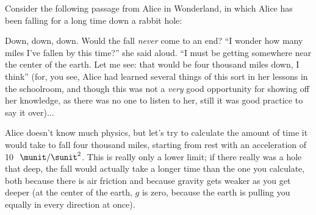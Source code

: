  Consider the following passage from Alice in Wonderland,
in which Alice has been falling for a long time down a rabbit hole:

Down, down, down. Would the fall \emph{never} come to an
end? ``I wonder how many miles I've fallen by this time?''
she said aloud. ``I must be getting somewhere near the
center of the earth. Let me see: that would be four thousand
miles down, I think'' (for, you see, Alice had learned
several things of this sort in her lessons in the schoolroom,
and though this was not a \emph{very} good opportunity for
showing off her knowledge, as there was no one to listen to
her, still it was good practice to say it over)...

Alice doesn't know much physics, but let's try to calculate
the amount of time it would take to fall four thousand
miles, starting from rest with an acceleration of 10
$\ \munit/\sunit^2$. This is really only a lower limit; if there really
was a hole that deep, the fall would actually take a longer
time than the one you calculate, both because there is air
friction and because gravity gets weaker as you get deeper
(at the center of the earth, $g$ is zero, because the earth
is pulling you equally in every direction at once).
\answercheck
